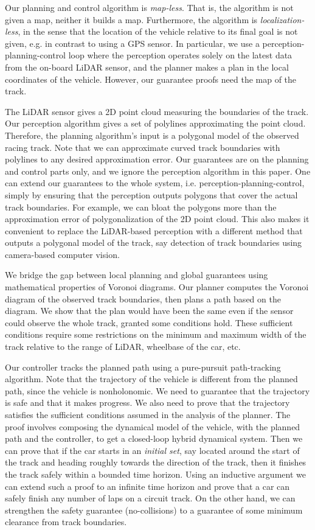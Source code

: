 Our planning and control algorithm is \emph{map-less}.
%
That is, the algorithm is not given a map, neither it builds a map.
%
Furthermore, the algorithm is \emph{localization-less}, in the sense that the location of the vehicle relative to its final goal is not given, e.g. in contrast to using a GPS sensor.
%
In particular, we use a perception-planning-control loop where the perception operates solely on the latest data from the on-board LiDAR sensor, and the planner makes a plan in the local coordinates of the vehicle.
%
However, our guarantee proofs need the map of the track.


The LiDAR sensor gives a 2D point cloud measuring the boundaries of the track.
%
Our perception algorithm gives a set of polylines approximating the point cloud.
%
Therefore, the planning algorithm's input is a polygonal model of the observed racing track.
%
Note that we can approximate curved track boundaries with polylines to any desired approximation error.
%
Our guarantees are on the planning and control parts only, and we ignore the perception algorithm in this paper.
%
One can extend our guarantees to the whole system, i.e. perception-planning-control, simply by ensuring that the perception outputs polygons that cover the actual track boundaries.
%
For example, we can bloat the polygons more than the approximation error of polygonalization of the 2D point cloud.
%
This also makes it convenient to replace the LiDAR-based perception with a different method that outputs a polygonal model of the track, say detection of track boundaries using camera-based computer vision.


We bridge the gap between local planning and global guarantees using mathematical properties of Voronoi diagrams.
%
Our planner computes the Voronoi diagram of the observed track boundaries, then plans a path based on the diagram.
%
We show that the plan would have been the same even if the sensor could observe the whole track, granted some conditions hold.
%
These sufficient conditions require some restrictions on the minimum and maximum width of the track relative to the range of LiDAR, wheelbase of the car, etc.


Our controller tracks the planned path using a pure-pursuit path-tracking algorithm.
%
Note that the trajectory of the vehicle is different from the planned path, since the vehicle is nonholonomic.
%
We need to guarantee that the trajectory is safe and that it makes progress.
%
We also need to prove that the trajectory satisfies the sufficient conditions assumed in the analysis of the planner.
%
The proof involves composing the dynamical model of the vehicle, with the planned path and the controller, to get a closed-loop hybrid dynamical system.
%
Then we can prove that if the car starts in an \emph{initial set}, say located around the start of the track and heading roughly towards the direction of the track, then it finishes the track safely within a bounded time horizon.
%
Using an inductive argument we can extend such a proof to an infinite time horizon and prove that a car can safely finish any number of laps on a circuit track.
%
On the other hand, we can strengthen the safety guarantee (no-collisions) to a guarantee of some minimum clearance from track boundaries.

